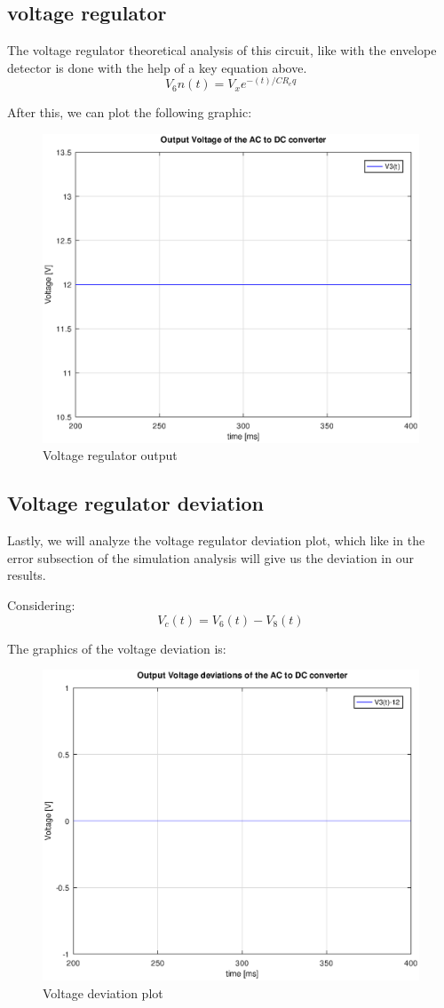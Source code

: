 \subsection{voltage regulator}

The voltage regulator theoretical analysis of this circuit, like with the envelope detector is done with the help of a key equation above.
\begin{equation}
	V_6n(t) = V_xe^{-(t)/CR_eq}
\end{equation}

After this, we can plot the following graphic:
\begin{figure}[h!] \centering
	\includegraphics[width=0.6\linewidth]{Output_Voltage_Regulater.eps}
	\caption{Voltage regulator output}
	\label{fig:rc1}
\end{figure}


\subsection{Voltage regulator deviation}

Lastly, we will analyze the voltage regulator deviation plot, which like in the error subsection of the simulation analysis will give us the deviation in our results.

Considering:
\begin{equation}
	V_c(t) = V_6(t) - V_8(t)
\end{equation} 



The graphics of the voltage deviation is:


\begin{figure}[h!] \centering
\includegraphics[width=0.6\linewidth]{Output_Voltage_Regulater_deviations.eps}
\caption{Voltage deviation plot}
\label{fig:rc4}
\end{figure}



